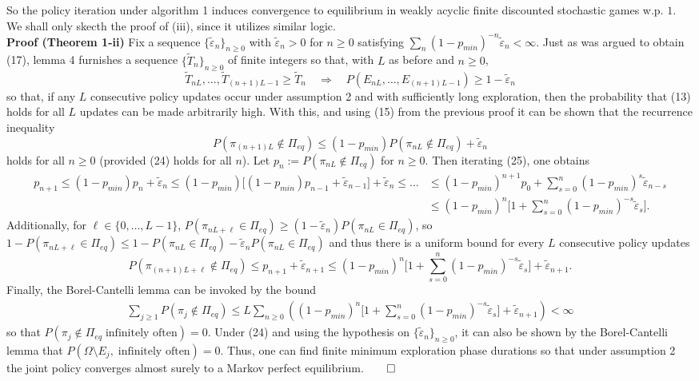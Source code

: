 \documentclass[10pt]{article}
\newcommand{\bp}[1]{\left({#1}\right)}
\newcommand{\1}[1]{\mathbbm{1}_{#1}}
\begin{document}
So the policy iteration under algorithm 1 induces convergence to equilibrium in weakly acyclic finite discounted stochastic games w.p. $1$. We shall only skecth the proof of (iii), since it utilizes similar logic.\\[5pt]
{\bf Proof (Theorem 1-ii)}\hspace{5pt} Fix a sequence $\{\tilde{\varepsilon}_n\}_{n\geq 0}$ with $\tilde{\varepsilon}_n>0$ for $n\geq 0$ satisfying $\sum_n(1-p_{min})^{-n}\tilde{\varepsilon}_n<\infty$. Just as was argued to obtain (17), lemma 4
furnishes a sequence $\{\tilde{T}_n\}_{n\geq 0}$ of finite integers so that, with $L$ as before and $n\geq 0$,
\[\tilde{T}_{nL},\dots,\tilde{T}_{(n+1)L -1}\geq\tilde{T}_n\quad\Rightarrow\quad P(E_{nL},\dots,E_{(n+1)L-1})\geq 1-\tilde{\varepsilon}_n\tag{24}\]
so that, if any $L$ consecutive policy updates occur under assumption 2 and with sufficiently long exploration, then the probability that (13) holds for all $L$ updates can be made arbitrarily high. With this, and using (15) from the previous proof it can be shown that the recurrence inequality
\[P(\pi_{(n+1)L}\notin\Pi_{eq})\leq(1-p_{min})P(\pi_{nL}\notin\Pi_{eq})+\tilde{\varepsilon}_n\tag{25}\]
holds for all $n\geq 0$ (provided (24) holds for all $n$). Let $p_{n}:=P(\pi_{nL}\notin\Pi_{eq})$ for $n\geq 0$. Then iterating (25), one obtains
\begin{align*}
    p_{n+1}\leq (1-p_{min})p_n+\tilde{\varepsilon}_n\leq(1-p_{min})\big[(1-p_{min})p_{n-1}+\tilde{\varepsilon}_{n-1}\big]+\tilde{\varepsilon}_n\leq\dots&\leq (1-p_{min})^{n+1}p_0+\sum_{s=0}^n(1-p_{min})^s\tilde{\varepsilon}_{n-s}\\
    &\leq(1-p_{min})^n\big[1+\sum_{s=0}^n(1-p_{min})^{-s}\tilde{\varepsilon}_s\big].\tag{26}
\end{align*}
Additionally, for $\ell\in\{0,\dots,L-1\}$, $P(\pi_{nL+\ell}\in\Pi_{eq})\geq (1-\tilde{\varepsilon}_n)P(\pi_{nL}\in\Pi_{eq})$, so $1-P(\pi_{nL+\ell}\in\Pi_{eq})\leq 1-P(\pi_{nL}\in\Pi_{eq})-\tilde{\varepsilon}_nP(\pi_{nL}\in\Pi_{eq})$ and thus there is a uniform bound for every $L$ consecutive policy updates
\[P(\pi_{(n+1)L+\ell}\notin\Pi_{eq})\leq p_{n+1}+\tilde{\varepsilon}_{n+1}\leq(1-p_{min})^n\big[1+\sum_{s=0}^n(1-p_{min})^{-s}\tilde{\varepsilon}_s\big]+\tilde{\varepsilon}_{n+1}.\tag{27}\]
Finally, the Borel-Cantelli lemma can be invoked by the bound
\begin{align*}
    \sum_{j\geq 1}P(\pi_j\notin\Pi_{eq})\leq L\sum_{n\geq 0}\bp{(1-p_{min})^n\big[1+\sum_{s=0}^n(1-p_{min})^{-s}\tilde{\varepsilon}_s\big]+\tilde{\varepsilon}_{n+1}}<\infty
\end{align*}
so that $P(\pi_j\notin\Pi_{eq}\;\text{infinitely often})=0$. Under (24) and using the hypothesis on $\{\tilde{\varepsilon}_n\}_{n\geq 0}$, it can also be shown by the Borel-Cantelli lemma that $P(\Omega\setminus E_j,\;\text{infinitely often})=0$. Thus, one can find finite minimum exploration phase durations so that under assumption 2 the joint policy converges almost surely to
a Markov perfect equilibrium.\hfill{$\qed$}
\end{document}
